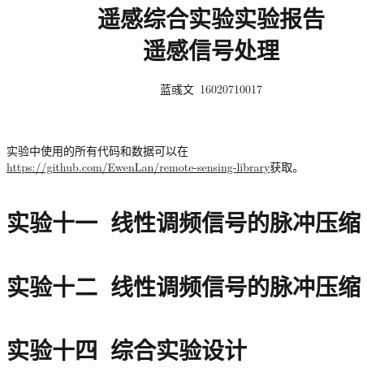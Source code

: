 \documentclass[hyperref, UTF8]{ctexart}
\title{遥感综合实验实验报告\\遥感信号处理}
\author{蓝彧文~16020710017}
\begin{document}
	\maketitle
	\tableofcontents
	\newpage
	实验中使用的所有代码和数据可以在\\ \url{https://github.com/EwenLan/remote-sensing-library}获取。
	\section{实验十一~线性调频信号的脉冲压缩}
	
	\section{实验十二~线性调频信号的脉冲压缩}
	
	\section{实验十四~综合实验设计}
	
\end{document}

